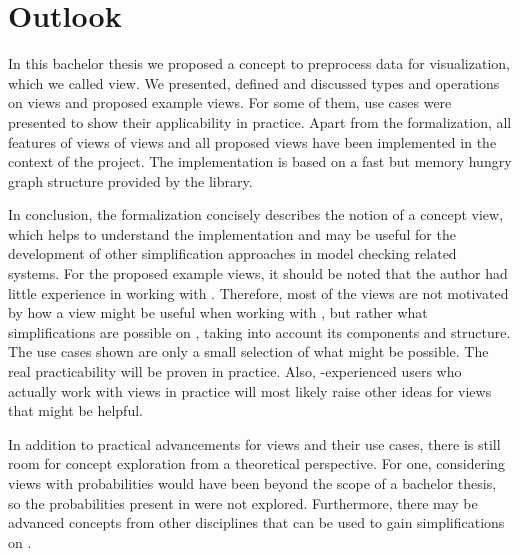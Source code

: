 \documentclass[preview]{standalone}
\begin{document}
\section{Outlook}

In this bachelor thesis we proposed a concept to preprocess data for visualization, which we called view. We presented, defined and discussed types and operations on views and proposed example views. For some of them, use cases were presented to show their applicability in practice. Apart from the formalization, all features of views of views and all proposed views have been implemented in the context of the \pmcvis project. The implementation is based on a fast but memory hungry graph structure provided by the \jgrapht library.

In conclusion, the formalization concisely describes the notion of a concept view, which helps to understand the implementation and may be useful for the development of other simplification approaches in model checking related systems. For the proposed example views, it should be noted that the author had little experience in working with \mdpsN. Therefore, most of the views are not motivated by how a view might be useful when working with \mdpN, but rather what simplifications are possible on \mdpsN, taking into account its components and structure. The use cases shown are only a small selection of what might be possible. The real practicability will be proven in practice. Also, \mdpN-experienced users who actually work with views in practice will most likely raise other ideas for views that might be helpful.

In addition to practical advancements for views and their use cases, there is still room for concept exploration from a theoretical perspective. For one, considering views with probabilities would have been beyond the scope of a bachelor thesis, so the probabilities present in \mdpsN were not explored. Furthermore, there may be advanced concepts from other disciplines that can be used to gain simplifications on \mdpsN.
\end{document}
